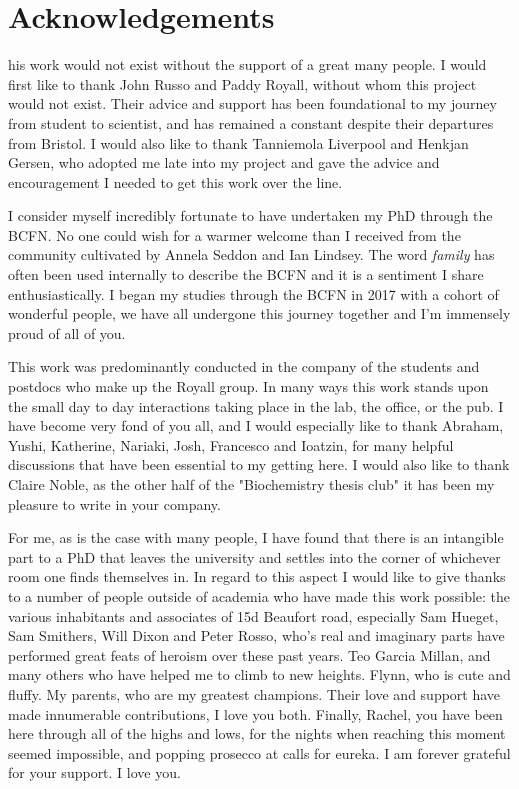 
\chapter*{Acknowledgements}
\begin{SingleSpace}


his work would not exist without the support of a great many people. I would first like to thank John Russo and Paddy Royall, without whom this project would not exist. Their advice and support has been foundational to my journey from student to scientist, and has remained a constant despite their departures from Bristol. I would also like to thank Tanniemola Liverpool and Henkjan Gersen, who adopted me late into my project and gave the advice and encouragement I needed to get this work over the line.

I consider myself incredibly fortunate to have undertaken my PhD through the BCFN. No one could wish for a warmer welcome than I received from the community cultivated by Annela Seddon and Ian Lindsey. The word \textit{family} has often been used internally to describe the BCFN and it is a sentiment I share enthusiastically. I began my studies through the BCFN in 2017 with a cohort of wonderful people, we have all undergone this journey together and I'm immensely proud of all of you. 

This work was predominantly conducted in the company of the students and postdocs who make up the Royall group. In many ways this work stands upon the small day to day interactions taking place in the lab, the office, or the pub. I have become very fond of you all, and I would especially like to thank Abraham, Yushi, Katherine, Nariaki, Josh, Francesco and Ioatzin, for many helpful discussions that have been essential to my getting here. I would also like to thank Claire Noble, as the other half of the "Biochemistry thesis club" it has been my pleasure to write in your company.

For me, as is the case with many people, I have found that there is an intangible part to a PhD that leaves the university and settles into the corner of whichever room one finds themselves in.
In regard to this aspect I would like to give thanks to a number of people outside of academia who have made this work possible: the various inhabitants and associates of 15d Beaufort road, especially Sam Hueget, Sam Smithers, Will Dixon and Peter Rosso, who's real and imaginary parts have performed great feats of heroism over these past years. Teo Garcia Millan, and many others who have helped me to climb to new heights. Flynn, who is cute and fluffy. My parents, who are my greatest champions. Their love and support have made innumerable contributions, \newline I love you both. Finally, Rachel, you have been here through all of the highs and lows, for the nights when reaching this moment seemed impossible, and popping prosecco at calls for eureka. I am forever grateful for your support. I love you.     



\end{SingleSpace}
\clearpage